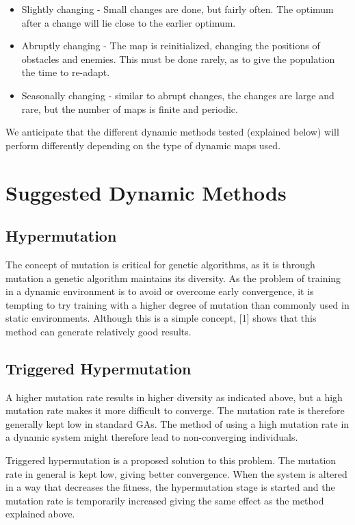 \documentclass[a4paper,12pt]{article}
\begin{document}
\begin{itemize}

\item
Slightly changing - Small changes are done, but fairly often. The optimum after a change will lie close to the earlier optimum.
\item
Abruptly changing - The map is reinitialized, changing the positions of obstacles and enemies. This must be done rarely, as to give the population the time to re-adapt.
\item
Seasonally changing - similar to abrupt changes, the changes are large and rare, but the number of maps is finite and periodic.
\end{itemize}

We anticipate that the different dynamic methods tested (explained below) will perform differently depending on the type of dynamic maps used.

\section{Suggested Dynamic Methods}
\subsection{Hypermutation}
The concept of mutation is critical for genetic algorithms, as it is through mutation a genetic algorithm maintains its diversity. As the problem of training in a dynamic environment is to avoid or overcome early convergence, it is tempting to try training with a higher degree of mutation than commonly used in static environments. Although this is a simple concept, [1] shows that this method can generate relatively good results.

\subsection{Triggered Hypermutation}
A higher mutation rate results in higher diversity as indicated above, but a high mutation rate makes it more difficult to converge. The mutation rate is therefore generally kept low in standard GAs. The method of using a high mutation rate in a dynamic system might therefore lead to non-converging individuals.

Triggered hypermutation is a proposed solution to this problem. The mutation rate in general is kept low, giving better convergence. When the system is altered in a way that decreases the fitness, the hypermutation stage is started and the mutation rate is temporarily increased giving the same effect as the method explained above.
\end{document}
